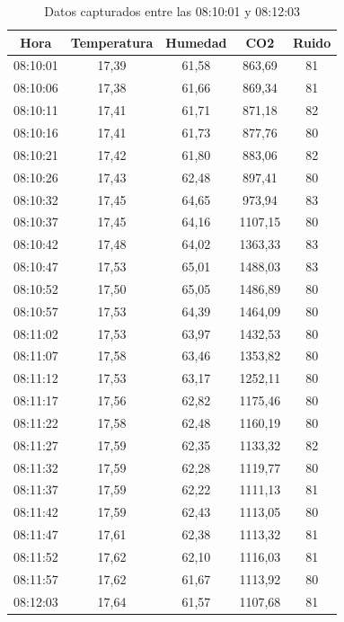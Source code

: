 \documentclass{templateNote}
\begin{document}
\begin{table}[H]
    \centering
        \begin{tabular}{|c|c|c|c|c|}
        \hline
            Hora    & Temperatura & Humedad & CO2 & Ruido \\ \hline
            08:10:01 & 17,39 & 61,58 & 863,69 & 81 \\ \hline
            08:10:06 & 17,38 & 61,66 & 869,34 & 81 \\ \hline
            08:10:11 & 17,41 & 61,71 & 871,18 & 82 \\ \hline
            08:10:16 & 17,41 & 61,73 & 877,76 & 80 \\ \hline
            08:10:21 & 17,42 & 61,80 & 883,06 & 82 \\ \hline
            08:10:26 & 17,43 & 62,48 & 897,41 & 80 \\ \hline
            08:10:32 & 17,45 & 64,65 & 973,94 & 83 \\ \hline
            08:10:37 & 17,45 & 64,16 & 1107,15 & 80 \\ \hline
            08:10:42 & 17,48 & 64,02 & 1363,33 & 83 \\ \hline
            08:10:47 & 17,53 & 65,01 & 1488,03 & 83 \\ \hline
            08:10:52 & 17,50 & 65,05 & 1486,89 & 80 \\ \hline
            08:10:57 & 17,53 & 64,39 & 1464,09 & 80 \\ \hline
            08:11:02 & 17,53 & 63,97 & 1432,53 & 80 \\ \hline
            08:11:07 & 17,58 & 63,46 & 1353,82 & 80 \\ \hline
            08:11:12 & 17,53 & 63,17 & 1252,11 & 80 \\ \hline
            08:11:17 & 17,56 & 62,82 & 1175,46 & 80 \\ \hline
            08:11:22 & 17,58 & 62,48 & 1160,19 & 80 \\ \hline
            08:11:27 & 17,59 & 62,35 & 1133,32 & 82 \\ \hline
            08:11:32 & 17,59 & 62,28 & 1119,77 & 80 \\ \hline
            08:11:37 & 17,59 & 62,22 & 1111,13 & 81 \\ \hline
            08:11:42 & 17,59 & 62,43 & 1113,05 & 80 \\ \hline
            08:11:47 & 17,61 & 62,38 & 1113,32 & 81 \\ \hline
            08:11:52 & 17,62 & 62,10 & 1116,03 & 81 \\ \hline
            08:11:57 & 17,62 & 61,67 & 1113,92 & 80 \\ \hline
            08:12:03 & 17,64 & 61,57 & 1107,68 & 81 \\ \hline
        \end{tabular}
    \caption{Datos capturados entre las 08:10:01 y 08:12:03}
    \label{tab:datos}
\end{table}
\end{document}
